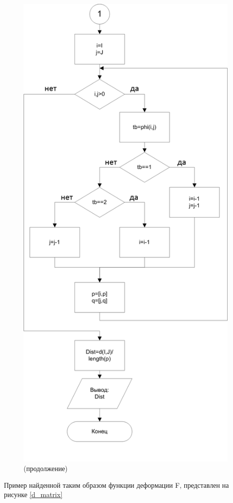 \documentclass[a4paper,14pt,russian,utf8,nocolumnsxix,nocolumnxxxi,nocolumnxxxii]{eskdtext}
\begin{document}
\addtocounter{figure}{-1}
\begin{figure}[H]	
	\centering
	\includegraphics[width=110mm]{block2.png}			
	\caption{(продолжение)}
	\label{block2}
\end{figure}

Пример найденной таким образом функции деформации F, представлен на рисунке \ref{d_matrix}
\end{document}
